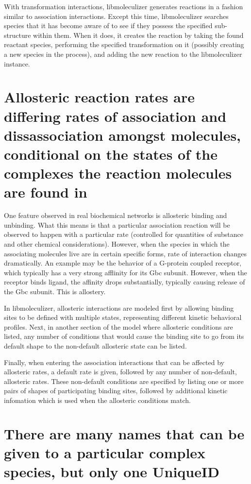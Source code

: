 With transformation interactions, libmoleculizer generates 
reactions in a fashion similar to association interactions.  Except
this time, libmoleculizer searches species that it has become aware of
to see if they possess the specified sub-structure within them.  When
it does, it creates the reaction by taking the found reactant species,
performing the specified transformation on it (possibly creating a new
species in the process), and adding the new reaction to the
libmoleculizer instance.  

\section{Allosteric reaction rates are differing rates of association
  and dissassociation amongst molecules, conditional on the states of
  the complexes the reaction molecules are found in}  

One feature observed in real biochemical networks is allosteric
binding and unbinding.  What this means is that a particular
association reaction will be observed to happen with a particular rate
(controlled for quantities of substance and other chemical
considerations).  However, when the species in which the associating
molecules live are in certain specific forms, rate of interaction
changes dramatically.  An example may be the behavior of a G-protein
coupled receptor, which typically has a very strong afflinity for its
Gbc subunit.  However, when the receptor binds ligand, the affinity
drops substantially, typically causing release of the Gbc subunit.
This is allostery.  

In libmoleculizer, allosteric interactions are modeled first by
allowing binding sites to be defined with multiple states,
representing different kinetic behavioral profiles.  Next, in another
section of the model where allosteric conditions are listed, any
number of conditions that would cause the binding site to go from its
default shape to the non-default allosteric state can be listed.

Finally, when entering the association interactions that can be
affected by allosteric rates, a default rate is given, followed by any
number of non-default, allosteric rates.  These non-default conditions
are specified by listing one or more pairs of shapes of participating
binding sites, followed by additional kinetic infomation which is used
when the allosteric conditions match.


\section{There are many names that can be given to a particular
  complex species, but only one UniqueID}  

